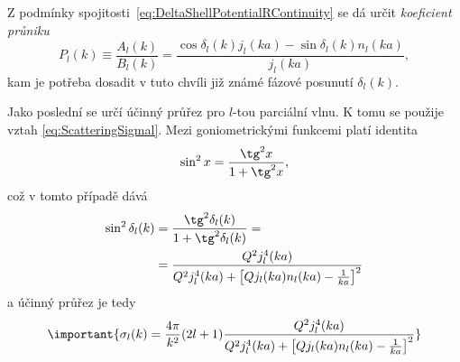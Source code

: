 \begin{solution}
		Z podmínky spojitosti~\eqref{eq:DeltaShellPotentialRContinuity} se dá určit \emph{koeficient průniku}
		\begin{equation}\label{eq:DeltaShellPotentialP}
			P_{l}(k)
				\equiv\frac{A_{l}(k)}{B_{l}(k)}
				=\frac{\cos{\delta_{l}(k)}j_{l}(ka)-\sin{\delta_{l}(k)}n_{l}(ka)}{j_{l}(ka)},
		\end{equation}
		kam je potřeba dosadit v tuto chvíli již známé fázové posunutí $\delta_{l}(k)$.

		Jako poslední se určí účinný průřez pro $l$-tou parciální vlnu.
		K tomu se použije vztah \eqref{eq:ScatteringSigmal}.
		Mezi goniometrickými funkcemi platí identita
		\begin{equation}
			\sin^{2}x=\frac{\tg^{2}x}{1+\tg^{2}x},
		\end{equation}
		což v tomto případě dává
		\begin{align}
			\sin^{2}\delta_{l}(k)
				&=\frac{\tg^{2}\delta_{l}(k)}{1+\tg^{2}\delta_{l}(k)}=\nonumber\\
				&=\frac{Q^{2}j_{l}^{4}(ka)}{Q^{2}j_{l}^{4}(ka)+\left[Qj_l(ka)n_{l}(ka)-\frac{1}{ka}\right]^{2}}
		\end{align}
		a účinný průřez je tedy
		\begin{equation}\label{eq:DeltaShellPotentialCrossSection}
			\important{
				\sigma_{l}(k)
					=\frac{4\pi}{k^{2}}(2l+1)
						\frac{Q^{2}j_{l}^{4}(ka)}{Q^{2}j_{l}^{4}(ka)+\left[Qj_l(ka)n_{l}(ka)-\frac{1}{ka}\right]^{2}}
			}
		\end{equation}


\end{solution}
